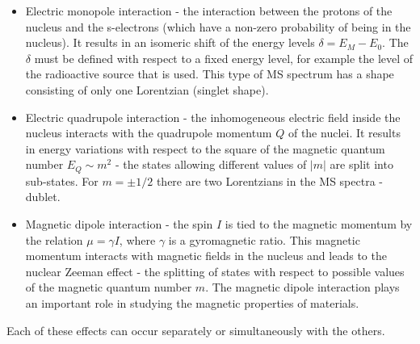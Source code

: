 \begin{itemize}
\item Electric monopole interaction - the interaction between the protons of the nucleus and the s-electrons (which have a non-zero probability of being in the nucleus). It results in an isomeric shift of the energy levels $\delta = E_M - E_0$. The $\delta$ must be defined with respect to a fixed energy level, for example the level of the radioactive source that is used. This type of MS spectrum has a shape consisting of only one Lorentzian (singlet shape).
\item Electric quadrupole interaction - the inhomogeneous electric field inside the nucleus interacts with the quadrupole momentum $Q$ of the nuclei. It results in energy variations with respect to the square of the magnetic quantum number $E_Q \sim m^{2}$ - the states allowing different values of $|m|$ are split into sub-states. For $m = \pm 1/2$ there are two Lorentzians in the MS spectra - dublet.
\item Magnetic dipole interaction - the spin $I$ is tied to the magnetic momentum by the relation $\mu = \gamma I$, where $\gamma$ is a gyromagnetic ratio. This magnetic momentum interacts with magnetic fields in the nucleus and leads to the nuclear Zeeman effect - the splitting of states with respect to possible values of the magnetic quantum number $m$. The magnetic dipole interaction plays an important role in studying the magnetic properties of materials.
\end{itemize}
Each of these effects can occur separately or simultaneously with the others.
%
%
